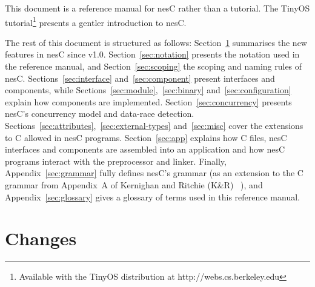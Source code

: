 \documentclass[11pt,letterpaper]{article}
\newcommand{\nesc}{nesC\xspace}
\newcommand{\tinyos}{TinyOS\xspace}
\begin{document}
This document is a reference manual for \nesc rather than a tutorial. The
\tinyos tutorial\footnote{Available with the \tinyos distribution at
http://webs.cs.berkeley.edu} presents a gentler introduction to \nesc.

The rest of this document is structured as follows:
Section~\ref{sec:changes} summarises the new features in \nesc since v1.0.
Section~\ref{sec:notation} presents the notation used in the reference
manual, and Section~\ref{sec:scoping} the scoping and naming rules of
\nesc. Sections~\ref{sec:interface} and~\ref{sec:component} present
interfaces and components, while
Sections~\ref{sec:module},~\ref{sec:binary} and~\ref{sec:configuration}
explain how components are implemented. Section~\ref{sec:concurrency}
presents \nesc's concurrency model and data-race
detection. Sections~\ref{sec:attributes},~\ref{sec:external-types}
and~\ref{sec:misc} cover the extensions to C allowed in \nesc
programs. Section~\ref{sec:app} explains how C files, \nesc interfaces and
components are assembled into an application and how \nesc programs
interact with the preprocessor and linker. Finally,
Appendix~\ref{sec:grammar} fully defines \nesc's grammar (as an extension
to the C grammar from Appendix~A of Kernighan and Ritchie (K\&R)
~\cite[pp234--239]{kandr}), and Appendix~\ref{sec:glossary} gives a
glossary of terms used in this reference manual.

\section{Changes}
\label{sec:changes}
\end{document}
